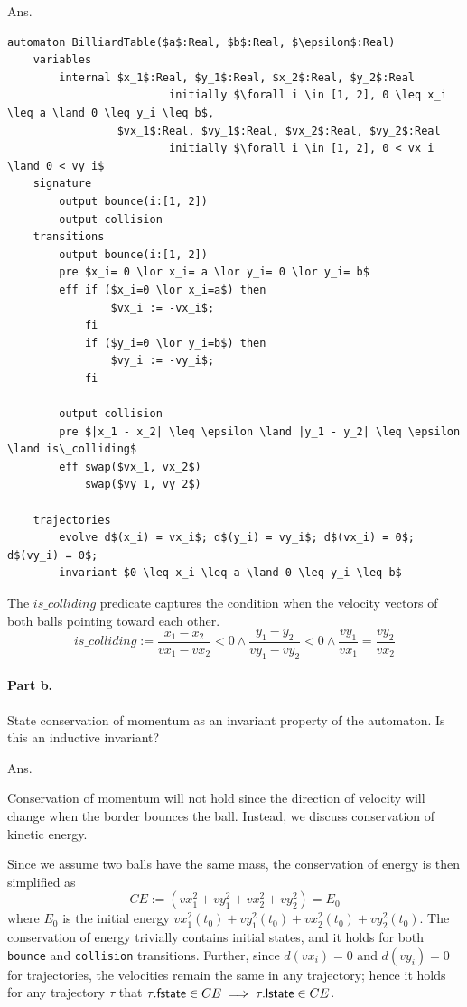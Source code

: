 \documentclass[11pt]{article}
\begin{document}
Ans.
\begin{lstlisting}[language=ioaLang, mathescape=true]
automaton BilliardTable($a$:Real, $b$:Real, $\epsilon$:Real)
    variables
        internal $x_1$:Real, $y_1$:Real, $x_2$:Real, $y_2$:Real 
                         initially $\forall i \in [1, 2], 0 \leq x_i \leq a \land 0 \leq y_i \leq b$,
                 $vx_1$:Real, $vy_1$:Real, $vx_2$:Real, $vy_2$:Real
                         initially $\forall i \in [1, 2], 0 < vx_i \land 0 < vy_i$
    signature
        output bounce(i:[1, 2])
        output collision
    transitions
        output bounce(i:[1, 2])
        pre $x_i= 0 \lor x_i= a \lor y_i= 0 \lor y_i= b$
        eff if ($x_i=0 \lor x_i=a$) then
                $vx_i := -vx_i$;
            fi
            if ($y_i=0 \lor y_i=b$) then
                $vy_i := -vy_i$;
            fi

        output collision
        pre $|x_1 - x_2| \leq \epsilon \land |y_1 - y_2| \leq \epsilon \land is\_colliding$
        eff swap($vx_1, vx_2$)
            swap($vy_1, vy_2$)

    trajectories
        evolve d$(x_i) = vx_i$; d$(y_i) = vy_i$; d$(vx_i) = 0$; d$(vy_i) = 0$;
        invariant $0 \leq x_i \leq a \land 0 \leq y_i \leq b$
\end{lstlisting}

The $is\_colliding$ predicate captures the condition when the velocity vectors of both balls pointing toward each other.
\[
is\_colliding := \frac{x_1 - x_2}{vx_1 - vx_2}<0 \land \frac{y_1 - y_2}{vy_1 - vy_2}<0 \land \frac{vy_1}{vx_1} = \frac{vy_2}{vx_2}
\]
\newpage

\paragraph{Part b.} State conservation of momentum as an invariant property of the automaton. Is this an inductive invariant?

Ans.

Conservation of momentum will not hold since the direction of velocity will change when the border bounces the ball.
Instead, we discuss conservation of kinetic energy.

Since we assume two balls have the same mass, the conservation of energy is then simplified as
\[
    CE := \left({vx_1^2 + vy_1^2} + {vx_2^2 + vy_2^2}\right) = E_0
\]
where $E_0$ is the initial energy ${vx_1^2(t_0) + vy_1^2(t_0)} + {vx_2^2(t_0) + vy_2^2(t_0)}$.
The conservation of energy trivially contains initial states,
and it holds for both \texttt{bounce} and \texttt{collision} transitions.
Further, since $d(vx_i) = 0$ and $d(vy_i) = 0$ for trajectories,
the velocities remain the same in any trajectory;
hence it holds for any trajectory $\tau$ that $\tau.{\sf fstate} \in CE \implies \tau.{\sf lstate} \in CE$.
\end{document}
